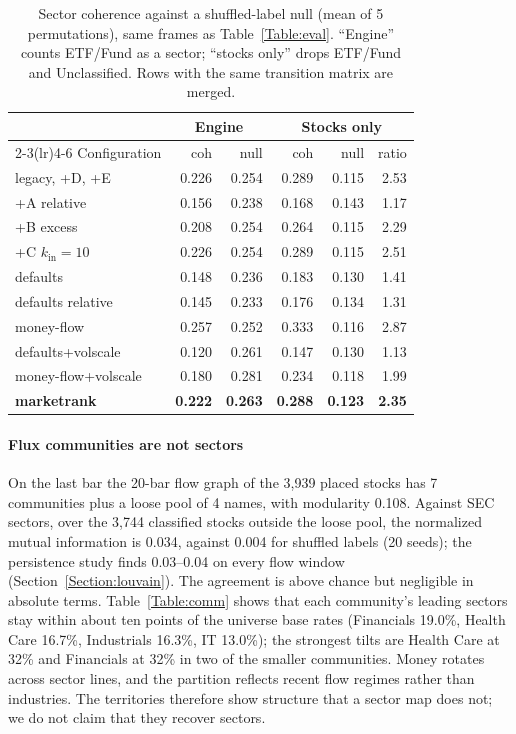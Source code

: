 \documentclass[preprint,3p,twocolumn]{elsarticle}
\begin{document}
\begin{table}[t]
\centering
\caption{Sector coherence against a shuffled-label null (mean of 5 permutations), same frames as Table~\ref{Table:eval}. ``Engine'' counts ETF/Fund as a sector; ``stocks only'' drops ETF/Fund and Unclassified. Rows with the same transition matrix are merged.}
\label{Table:coh}
\footnotesize\setlength{\tabcolsep}{3pt}
\begin{tabular}{lrrrrr}
\toprule
 & \multicolumn{2}{c}{Engine} & \multicolumn{3}{c}{Stocks only}\\
\cmidrule(lr){2-3}\cmidrule(lr){4-6}
Configuration & coh & null & coh & null & ratio\\
\midrule
legacy, +D, +E      & 0.226 & 0.254 & 0.289 & 0.115 & 2.53\\
+A relative         & 0.156 & 0.238 & 0.168 & 0.143 & 1.17\\
+B excess           & 0.208 & 0.254 & 0.264 & 0.115 & 2.29\\
+C $k_{\mathrm{in}}=10$ & 0.226 & 0.254 & 0.289 & 0.115 & 2.51\\
defaults            & 0.148 & 0.236 & 0.183 & 0.130 & 1.41\\
defaults relative   & 0.145 & 0.233 & 0.176 & 0.134 & 1.31\\
money-flow          & 0.257 & 0.252 & 0.333 & 0.116 & 2.87\\
defaults+volscale   & 0.120 & 0.261 & 0.147 & 0.130 & 1.13\\
money-flow+volscale & 0.180 & 0.281 & 0.234 & 0.118 & 1.99\\
\textbf{marketrank} & \textbf{0.222} & \textbf{0.263} & \textbf{0.288} & \textbf{0.123} & \textbf{2.35}\\
\bottomrule
\end{tabular}
\end{table}

\paragraph{Flux communities are not sectors} On the last bar the 20-bar flow graph of the 3,939 placed stocks has 7 communities plus a loose pool of 4 names, with modularity 0.108. Against SEC sectors, over the 3,744 classified stocks outside the loose pool, the normalized mutual information is 0.034, against 0.004 for shuffled labels (20 seeds); the persistence study finds 0.03--0.04 on every flow window (Section~\ref{Section:louvain}). The agreement is above chance but negligible in absolute terms. Table~\ref{Table:comm} shows that each community's leading sectors stay within about ten points of the universe base rates (Financials 19.0\%, Health Care 16.7\%, Industrials 16.3\%, IT 13.0\%); the strongest tilts are Health Care at 32\% and Financials at 32\% in two of the smaller communities. Money rotates across sector lines, and the partition reflects recent flow regimes rather than industries. The territories therefore show structure that a sector map does not; we do not claim that they recover sectors.
\end{document}
